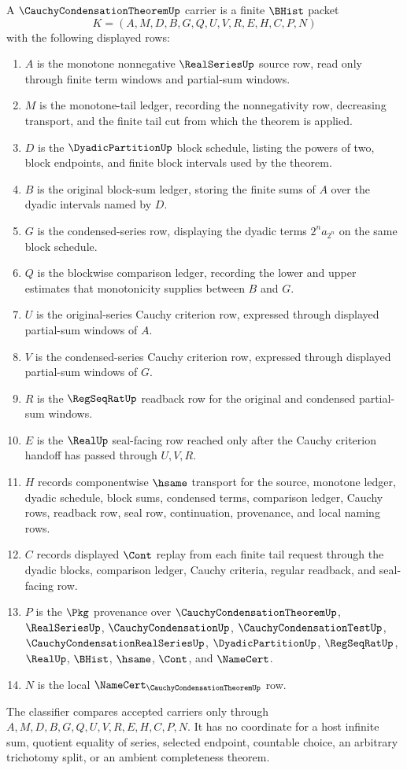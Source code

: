\begin{definition}
\label{def:cauchy-condensation-theorem-carrier}
A $\CauchyCondensationTheoremUp$ carrier is a finite $\BHist$ packet
$$
K=(A,M,D,B,G,Q,U,V,R,E,H,C,P,N)
$$
with the following displayed rows:
\begin{enumerate}
\item $A$ is the monotone nonnegative $\RealSeriesUp$ source row, read only through finite term windows and partial-sum windows.
\item $M$ is the monotone-tail ledger, recording the nonnegativity row, decreasing transport, and the finite tail cut from which the theorem is applied.
\item $D$ is the $\DyadicPartitionUp$ block schedule, listing the powers of two, block endpoints, and finite block intervals used by the theorem.
\item $B$ is the original block-sum ledger, storing the finite sums of $A$ over the dyadic intervals named by $D$.
\item $G$ is the condensed-series row, displaying the dyadic terms $2^n a_{2^n}$ on the same block schedule.
\item $Q$ is the blockwise comparison ledger, recording the lower and upper estimates that monotonicity supplies between $B$ and $G$.
\item $U$ is the original-series Cauchy criterion row, expressed through displayed partial-sum windows of $A$.
\item $V$ is the condensed-series Cauchy criterion row, expressed through displayed partial-sum windows of $G$.
\item $R$ is the $\RegSeqRatUp$ readback row for the original and condensed partial-sum windows.
\item $E$ is the $\RealUp$ seal-facing row reached only after the Cauchy criterion handoff has passed through $U,V,R$.
\item $H$ records componentwise $\hsame$ transport for the source, monotone ledger, dyadic schedule, block sums, condensed terms, comparison ledger, Cauchy rows, readback row, seal row, continuation, provenance, and local naming rows.
\item $C$ records displayed $\Cont$ replay from each finite tail request through the dyadic blocks, comparison ledger, Cauchy criteria, regular readback, and seal-facing row.
\item $P$ is the $\Pkg$ provenance over $\CauchyCondensationTheoremUp$, $\RealSeriesUp$, $\CauchyCondensationUp$, $\CauchyCondensationTestUp$, $\CauchyCondensationRealSeriesUp$, $\DyadicPartitionUp$, $\RegSeqRatUp$, $\RealUp$, $\BHist$, $\hsame$, $\Cont$, and $\NameCert$.
\item $N$ is the local $\NameCert_{\CauchyCondensationTheoremUp}$ row.
\end{enumerate}
The classifier compares accepted carriers only through $A,M,D,B,G,Q,U,V,R,E,H,C,P,N$. It has no coordinate for a host infinite sum, quotient equality of series, selected endpoint, countable choice, an arbitrary trichotomy split, or an ambient completeness theorem.
\end{definition}

